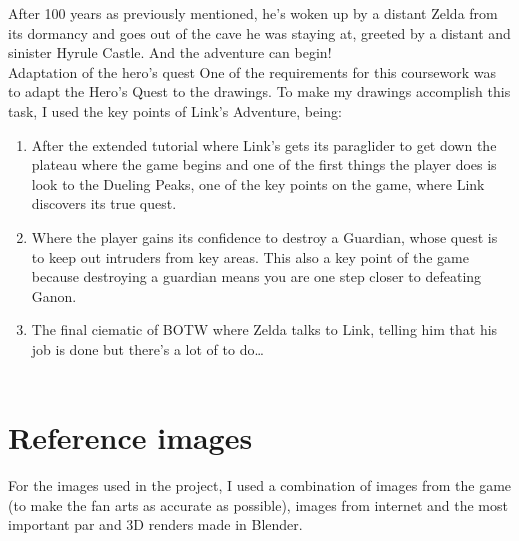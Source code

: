 \documentclass{cup-pan}
\begin{document}
    After 100 years as previously mentioned, he's woken up by a distant Zelda from its dormancy and goes out of the cave he was staying at, greeted by a distant and sinister Hyrule Castle. And the adventure can begin!\\
    
    \textcolor{PANDarkBlue}{\large Adaptation of the hero's quest}
    One of the requirements for this coursework was to adapt the Hero's Quest to the drawings.
    To make my drawings accomplish this task, I used the key points of Link's Adventure, being:\\
        \begin{enumerate}
            \item After the extended tutorial where Link's gets its paraglider to get down the plateau where the game begins and one of the first things the player does is look to the Dueling Peaks, one of the key points on the game, where Link discovers its true quest.\\
            \item Where the player gains its confidence to destroy a Guardian, whose quest is to keep out intruders from key areas. This also a key point of the game because destroying a guardian means you are one step closer to defeating Ganon. \\
            \item The final ciematic of BOTW where Zelda talks to Link, telling him that his job is done but there's a lot of to do\dots\\  \\
        \end{enumerate}


\section{Reference images}

    For the images used in the project, I used a combination of images from the game (to make the fan arts as accurate as possible), images from internet and the most important par and 3D renders made in Blender.\\
\end{document}
